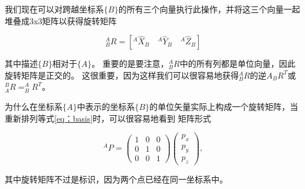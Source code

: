 
我们现在可以对跨越坐标系$ \{B \} $的所有三个向量执行此操作，并将这三个向量一起堆叠成3x3矩阵以获得旋转矩阵

%
\begin{equation}
^A_BR=[^A\hat{X}_B \quad ^A\hat{Y}_B \quad ^A\hat{Z}_B]
\end{equation}
%

其中描述$ \{B \} $相对于$ \{A \} $。 重要的是要注意，$ ^A_BR $中的所有列都是单位向量，因此旋转矩阵是正交的。 这很重要，因为这样我们可以很容易地获得$ ^ A_BR $的逆$ A_BR ^ T $或$ ^ B_AR = ^ A_BR ^ T $。


为什么在坐标系$ \{A \} $中表示的坐标系$ \{B \} $的单位矢量实际上构成一个旋转矩阵，当重新排列等式\ref {eq：basis}时，可以很容易地看到 矩阵形式

\begin{equation}
^AP=\left(\begin{array}{ccc}1 & 0 & 0\\0 & 1 & 0\\0 & 0 & 1\end{array}\right)\left(\begin{array}{c}p_x\\p_y\\p_z\end{array}\right),
\end{equation}


其中旋转矩阵不过是标识，因为两个点已经在同一坐标系中。

%

